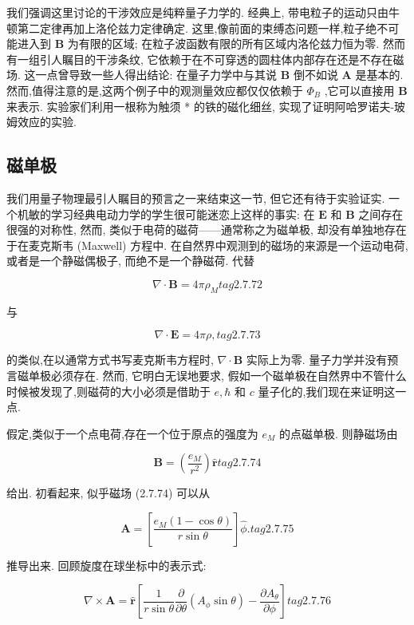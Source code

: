 \documentclass[lang=cn,newtx,10pt,scheme=chinese,thmcnt=section]{elegantbook}
\begin{document}
我们强调这里讨论的干涉效应是纯粹量子力学的. 经典上, 带电粒子的运动只由牛顿第二定律再加上洛伦兹力定律确定. 这里,像前面的束缚态问题一样,粒子绝不可能进入到 $\mathbf{B}$ 为有限的区域; 在粒子波函数有限的所有区域内洛伦兹力恒为零. 然而有一组引人瞩目的干涉条纹, 它依赖于在不可穿透的圆柱体内部存在还是不存在磁场. 这一点曾导致一些人得出结论: 在量子力学中与其说 $\mathbf{B}$ 倒不如说 $\mathbf{A}$ 是基本的. 然而,值得注意的是,这两个例子中的观测量效应都仅仅依赖于 ${\Phi }_{B}$ ,它可以直接用 $\mathbf{B}$ 来表示. 实验家们利用一根称为触须 * 的铁的磁化细丝, 实现了证明阿哈罗诺夫-玻姆效应的实验.

\subsection*{磁单极} 
我们用量子物理最引人瞩目的预言之一来结束这一节, 但它还有待于实验证实. 一个机敏的学习经典电动力学的学生很可能迷恋上这样的事实: 在 $\mathbf{E}$ 和 $\mathbf{B}$ 之间存在很强的对称性, 然而, 类似于电荷的磁荷——通常称之为磁单极, 却没有单独地存在于在麦克斯韦 (Maxwell) 方程中. 在自然界中观测到的磁场的来源是一个运动电荷, 或者是一个静磁偶极子, 而绝不是一个静磁荷. 代替

$$
\nabla \cdot \mathbf{B} = {4\pi }{\rho }_{M} tag{2.7.72}
$$

与

$$
\nabla \cdot \mathbf{E} = {4\pi \rho }, tag{2.7.73}
$$

的类似,在以通常方式书写麦克斯韦方程时, $\nabla \cdot \mathbf{B}$ 实际上为零. 量子力学并没有预言磁单极必须存在. 然而, 它明白无误地要求, 假如一个磁单极在自然界中不管什么时候被发现了,则磁荷的大小必须是借助于 $e,\hbar$ 和 $c$ 量子化的,我们现在来证明这一点.

假定,类似于一个点电荷,存在一个位于原点的强度为 ${e}_{M}$ 的点磁单极. 则静磁场由

$$
\mathbf{B} = \left( \frac{{e}_{M}}{{r}^{2}}\right) \widehat{\mathbf{r}} tag{2.7.74}
$$

给出. 初看起来, 似乎磁场 (2.7.74) 可以从

$$
\mathbf{A} = \left\lbrack \frac{{e}_{M}\left( {1 - \cos \theta }\right) }{r\sin \theta }\right\rbrack \widehat{\phi }. tag{2.7.75}
$$

推导出来. 回顾旋度在球坐标中的表示式:

$$
\nabla \times \mathbf{A} = \widehat{\mathbf{r}}\left\lbrack {\frac{1}{r\sin \theta }\frac{\partial }{\partial \theta }\left( {{A}_{\phi }\sin \theta }\right) - \frac{\partial {A}_{\theta }}{\partial \phi }}\right\rbrack tag{2.7.76}
$$
\end{document}
